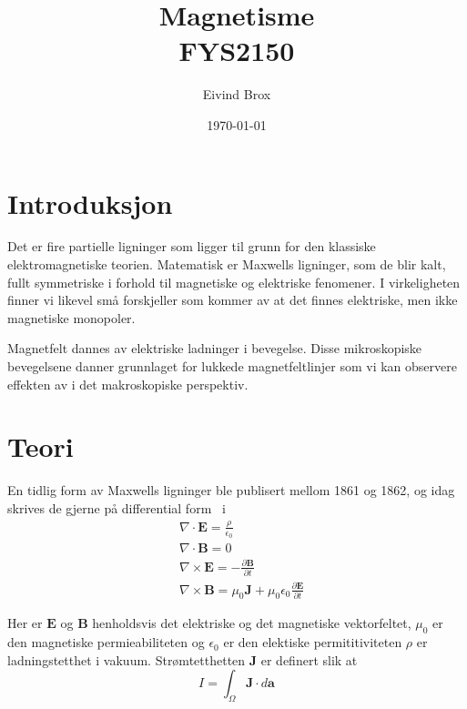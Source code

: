 \documentclass[a4paper,11pt, twocolumn]{article}
\title{Magnetisme\\ FYS2150}
\author{Eivind Brox}
\date{\today}
\begin{document}
\maketitle

\maketitle


\begin{abstract}
\end{abstract}

\section{Introduksjon}
Det er fire partielle ligninger som ligger til grunn for den klassiske elektromagnetiske teorien. Matematisk er Maxwells ligninger, som de blir kalt, fullt symmetriske i forhold til magnetiske og elektriske fenomener. I virkeligheten finner vi likevel små forskjeller som kommer av at det finnes elektriske, men ikke magnetiske monopoler.

Magnetfelt dannes av elektriske ladninger i bevegelse. Disse mikroskopiske bevegelsene danner grunnlaget for lukkede magnetfeltlinjer som vi kan observere effekten av i det makroskopiske perspektiv.
\section{Teori}
En tidlig form av Maxwells ligninger ble publisert mellom 1861 og 1862, og idag skrives de gjerne på differential form~\cite[kap. 9.3.3]{griffithsED}
i
\begin{align}
	&\nabla\cdot\mathbf{E}= \frac{\rho}{\epsilon_0}
	\label{eq:max1}\\
	&\nabla\cdot\mathbf{B} = 0
	\label{eq:max2}\\
	&\nabla\times\mathbf{E} = -\frac{\partial \mathbf{B}}{\partial t}
	\label{eq:max3}\\
	&\nabla\times\mathbf{B} = \mu_0\mathbf{J}+\mu_0\epsilon_0\frac{\partial\mathbf{E}}{\partial t}
	\label{eq:max4}
\end{align}

Her er $\mathbf{E}$ og $\mathbf{B}$ henholdsvis det elektriske og det magnetiske vektorfeltet, $\mu_0$ er den magnetiske permieabiliteten og $\epsilon_0$ er den elektiske permititiviteten $\rho$ er ladningstetthet i vakuum. Strømtetthetten $\mathbf{J}$ er definert slik at 
\begin{equation}
	I = \int_\Omega \mathbf{J}\cdot d\mathbf{a}
	\label{eq:currentDensity}
\end{equation}
\end{document}
